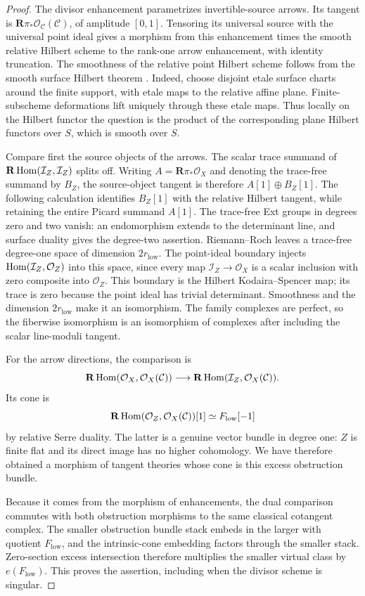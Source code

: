 \begin{proof}
The divisor enhancement parametrizes invertible-source arrows.
Its tangent is
\(\mathbf R\pi_*\mathcal O_{\mathcal C}(\mathcal C)\), of amplitude
\([0,1]\).
Tensoring its universal source with the universal point ideal gives
a morphism from this enhancement times the smooth relative Hilbert
scheme to the rank-one arrow enhancement, with identity truncation.
The smoothness of the relative point Hilbert scheme follows from the
smooth surface Hilbert theorem \cite[Theorem 2.4]{Fogarty}.
Indeed, choose disjoint etale surface charts around the finite support,
with etale maps to the relative affine plane. Finite-subscheme
deformations lift uniquely through these etale maps. Thus locally on
the Hilbert functor the question is the product of the corresponding
plane Hilbert functors over \(S\), which is smooth over \(S\).

Compare first the source objects of the arrows. The scalar trace
summand of \(\mathbf R\operatorname{Hom}(\mathcal I_Z,\mathcal I_Z)\) splits off.
Writing \(A=\mathbf R\pi_*\mathcal O_X\) and denoting the trace-free
summand by \(B_Z\), the source-object tangent is therefore
\(A[1]\oplus B_Z[1]\). The following calculation identifies
\(B_Z[1]\) with the relative Hilbert tangent, while retaining the
entire Picard summand \(A[1]\).
The trace-free Ext groups in degrees zero and two vanish: an
endomorphism extends to the determinant line, and surface duality
gives the degree-two assertion. Riemann--Roch leaves a trace-free
degree-one space of dimension \(2r_{\mathrm{low}}\).
The point-ideal boundary injects
\(\operatorname{Hom}(\mathcal I_Z,\mathcal O_Z)\) into this space, since every
map \(\mathcal I_Z\to\mathcal O_X\) is a scalar inclusion with zero
composite into \(\mathcal O_Z\).
This boundary is the Hilbert Kodaira--Spencer map; its trace is zero
because the point ideal has trivial determinant. Smoothness and the
dimension \(2r_{\mathrm{low}}\) make it an isomorphism.
The family complexes are perfect, so the fiberwise isomorphism is an
isomorphism of complexes after including the scalar line-moduli
tangent.

For the arrow directions, the comparison is
\[
 \mathbf R\operatorname{Hom}(\mathcal O_X,\mathcal O_X(\mathcal C))
 \longrightarrow
 \mathbf R\operatorname{Hom}(\mathcal I_Z,\mathcal O_X(\mathcal C)).
\]
Its cone is
\[
 \mathbf R\operatorname{Hom}(\mathcal O_Z,\mathcal O_X(\mathcal C))[1]
 \simeq F_{\mathrm{low}}[-1]
\]
by relative Serre duality. The latter is a genuine vector bundle in
degree one: \(Z\) is finite flat and its direct image has no higher
cohomology.
We have therefore obtained a morphism of tangent theories whose cone
is this excess obstruction bundle.

Because it comes from the morphism of enhancements, the dual
comparison commutes with both obstruction morphisms to the same
classical cotangent complex.
The smaller obstruction bundle stack embeds in the larger with
quotient \(F_{\mathrm{low}}\), and the intrinsic-cone embedding
factors through the smaller stack. Zero-section excess intersection
therefore multiplies the smaller virtual class by
\(e(F_{\mathrm{low}})\). This proves the assertion, including when
the divisor scheme is singular.
\end{proof}

